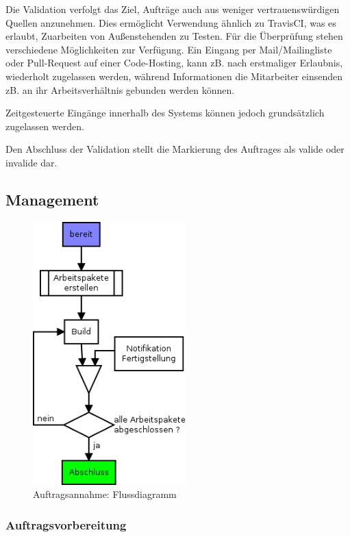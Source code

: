 
Die Validation verfolgt das Ziel, Aufträge auch aus weniger vertrauenswürdigen Quellen anzunehmen.
Dies ermöglicht Verwendung ähnlich zu TravisCI, was es erlaubt, Zuarbeiten von Außenstehenden zu Testen.
Für die Überprüfung stehen verschiedene Möglichkeiten zur Verfügung.
Ein Eingang per Mail/Mailingliste oder Pull-Request auf einer Code-Hosting,
kann zB. nach erstmaliger Erlaubnis, wiederholt zugelassen werden,
während Informationen die Mitarbeiter einsenden zB. an ihr Arbeitsverhältnis gebunden werden können.

Zeitgesteuerte Eingänge innerhalb des Systems können jedoch grundsätzlich zugelassen werden.

Den Abschluss der Validation stellt die Markierung des Auftrages als valide oder invalide dar.

\subsection{Management}

\begin{figure}[ht] 
  \centering
  \includegraphics[height=4in]{imageinput/lebenszyklus-auftrag-abarbeitung.png}
  \caption{Auftragsannahme: Flussdiagramm}
  \label{fig:lebenszyklus-auftrag-abarbeitung}
\end{figure}

\subsubsection{Auftragsvorbereitung}


